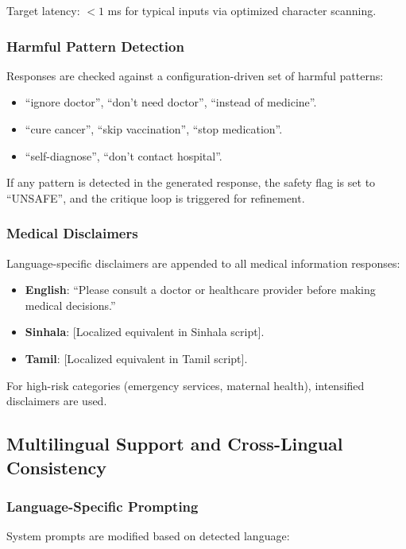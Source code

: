 \documentclass[11pt,a4paper]{article}
\begin{document}
Target latency: $< 1$ ms for typical inputs via optimized character scanning.

\subsubsection{Harmful Pattern Detection}
Responses are checked against a configuration-driven set of harmful patterns:

\begin{itemize}
    \item ``ignore doctor'', ``don't need doctor'', ``instead of medicine''.
    \item ``cure cancer'', ``skip vaccination'', ``stop medication''.
    \item ``self-diagnose'', ``don't contact hospital''.
\end{itemize}

If any pattern is detected in the generated response, the safety flag is set to ``UNSAFE'', and the critique loop is triggered for refinement.

\subsubsection{Medical Disclaimers}
Language-specific disclaimers are appended to all medical information responses:

\begin{itemize}
    \item \textbf{English}: ``Please consult a doctor or healthcare provider before making medical decisions.''
    \item \textbf{Sinhala}: [Localized equivalent in Sinhala script].
    \item \textbf{Tamil}: [Localized equivalent in Tamil script].
\end{itemize}

For high-risk categories (emergency services, maternal health), intensified disclaimers are used.

\subsection{Multilingual Support and Cross-Lingual Consistency}
\label{sec:multilingual}

\subsubsection{Language-Specific Prompting}
System prompts are modified based on detected language:
\end{document}
